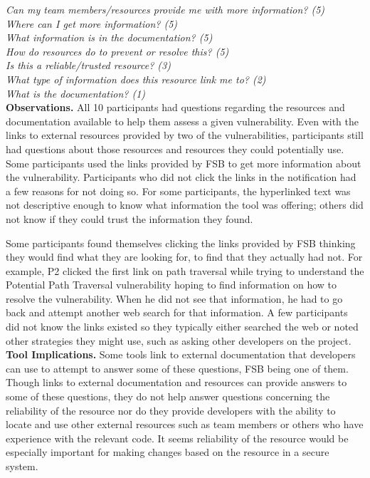 \documentclass[conference]{IEEEtran}
\begin{document}
\noindent\emph{Can my team members/resources provide me with more information? (5)} \\
\emph{Where can I get more information? (5)} \\
\emph{What information is in the documentation? (5)} \\
\emph{How do resources do to prevent or resolve this? (5)} \\
\emph{Is this a reliable/trusted resource? (3)} \\
\emph{What type of information does this resource link me to? (2)} \\
\emph{What is the documentation? (1)} \\



\noindent\textbf{Observations.}
All 10 participants had questions regarding the resources and documentation available to help them assess a given vulnerability. 
Even with the links to external resources provided by two of the vulnerabilities, participants still had questions about those resources and resources they could potentially use. 
Some participants used the links provided by FSB to get more information about the vulnerability.
Participants who did not click the links in the notification had a few reasons for not doing so.
For some participants, the hyperlinked text was not descriptive enough to know what information the tool was offering; others did not know if they could trust the information they found.

Some participants found themselves clicking the links provided by FSB thinking they would find what they are looking for, to find that they actually had not. 
For example, P2 clicked the first link on path traversal while trying to understand the Potential Path Traversal vulnerability hoping to find information on how to resolve the vulnerability.
When he did not see that information, he had to go back and attempt another web search for that information. 
A few participants did not know the links existed so they typically either searched the web or noted other strategies they might use, such as asking other developers on the project.
\\

\noindent\textbf{Tool Implications.}
Some tools link to external documentation that developers can use to attempt to answer some of these questions, FSB being one of them. 
Though links to external documentation and resources can provide answers to some of these questions, they do not help answer questions concerning the reliability of the resource nor do they provide developers with the ability to locate and use other external resources such as team members or others who have experience with the relevant code.
It seems reliability of the resource would be especially important for making changes based on the resource in a secure system.
\end{document}
